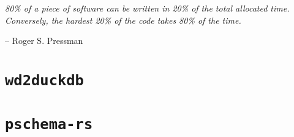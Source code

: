 \epigraph{\textit{80\% of a piece of software can be written in 20\% of the total allocated time. Conversely, the hardest 20\% of the code takes 80\% of the time.}}{-- \textup{Roger S. Pressman}}

\section{\texttt{wd2duckdb}}

\section{\texttt{pschema-rs}}
